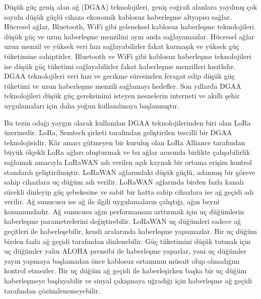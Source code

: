 Düşük güç geniş alan ağ (DGAA) teknolojileri, geniş coğrafi alanlara yayılmış çok sayıda düşük güçlü cihaza ekonomik kablosuz haberleşme altyapısı sağlar. Hücresel ağlar, Bluetooth, WiFi gibi geleneksel kablosuz haberleşme teknolojileri düşük güç ve uzun haberleşme menzilini aynı anda sağlayamazlar. Hücresel ağlar uzun menzil ve yüksek veri hızı sağlayabilirler fakat karmaşık ve yüksek güç tüketimine sahiptirler. Bluetooth ve WiFi gibi kablosuz haberleşme teknolojileri ise düşük güç tüketimi sağlayabilirler fakat haberleşme menzilleri kısıtlıdır. DGAA teknolojileri veri hızı ve gecikme süresinden feragat edip düşük güç tüketimi ve uzun haberleşme menzili sağlamayı hedefler. Son yıllarda DGAA teknolojileri düşük güç gereksinimi isteyen nesnelerin interneti ve akıllı şehir uygulamaları için daha yoğun kullanılmaya başlanmıştır.

Bu tezin odağı yaygın olarak kullanılan DGAA teknolojilerinden biri olan LoRa üzerinedir. LoRa, Semtech şirketi tarafından geliştirilen tescilli bir DGAA teknolojisidir. Kâr amacı gütmeyen bir kuruluş olan LoRa Alliance tarafından büyük ölçekli LoRa ağları oluşturmak ve bu ağlar arasında birlikte çalışabilirlik sağlamak amacıyla LoRaWAN adı verilen açık kaynak bir ortama erişim kontrol standardı geliştirilmiştir. LoRaWAN ağlarındaki düşük güçlü, adanmış bir göreve sahip cihazlara uç düğüm adı verilir. LoRaWAN ağlarında birden fazla kanalı sürekli dinleyip güç şebekesine ve sabit bir hatta sahip cihazlara ise ağ geçidi adı verilir. Ağ sunucusu ise ağ ile ilgili uygulamaların çalıştığı, ağın beyni konumundadır. Ağ sunucusu ağın performansını arttırmak için uç düğümlerin haberleşme parametrelerini değiştirebilir. LoRaWAN uç düğümleri sadece ağ geçitleri ile haberleşebilir, kendi aralarında haberleşme yapamazlar. Bir uç düğüm birden fazla ağ geçidi tarafından dinlenebilir. Güç tüketimini düşük tutmak için uç düğümler yalın ALOHA prensibi ile haberleşme yaparlar, yani uç düğümler yayın yapmaya başlamadan önce kablosuz ortamının müsait olup olmadığını kontrol etmezler. Bir uç düğüm ağ geçidi ile haberleşirken başka bir uç düğüm haberleşmeye başlayabilir ve sinyal çakışmaya uğradığı için haberleşme ağ geçidi tarafından çözümlenemeyebilir.

